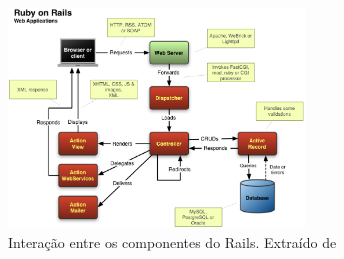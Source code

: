 \graphicspath{{figuras/}}
\begin{figure}[h]
\centering
\includegraphics[width=0.7\textwidth]{rails-overview}
\caption{Interação entre os componentes do Rails. Extraído  de \cite{mejia2011rails}}
\label{fig:rails-architecture}
\end{figure}


